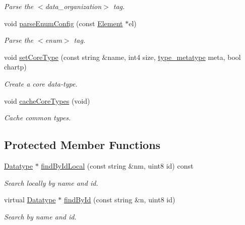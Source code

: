 \begin{DoxyCompactItemize}
\begin{DoxyCompactList}\small\item\em Parse the $<$data\+\_\+organization$>$ tag. \end{DoxyCompactList}\item 
void \mbox{\hyperlink{class_type_factory_a8d10b37cae4c213ca3a613f454ada676}{parse\+Enum\+Config}} (const \mbox{\hyperlink{class_element}{Element}} $\ast$el)
\begin{DoxyCompactList}\small\item\em Parse the $<$enum$>$ tag. \end{DoxyCompactList}\item 
void \mbox{\hyperlink{class_type_factory_a7f142a54450d41bc12ca18fe06c6e1e0}{set\+Core\+Type}} (const string \&name, int4 size, \mbox{\hyperlink{type_8hh_aef6429f2523cdf4d415ba04a0209e61f}{type\+\_\+metatype}} meta, bool chartp)
\begin{DoxyCompactList}\small\item\em Create a core data-\/type. \end{DoxyCompactList}\item 
void \mbox{\hyperlink{class_type_factory_a16ccfeecd29c1d5d40ada6b1d4032212}{cache\+Core\+Types}} (void)
\begin{DoxyCompactList}\small\item\em Cache common types. \end{DoxyCompactList}\end{DoxyCompactItemize}
\subsection*{Protected Member Functions}
\begin{DoxyCompactItemize}
\item 
\mbox{\hyperlink{class_datatype}{Datatype}} $\ast$ \mbox{\hyperlink{class_type_factory_ab86f43d69c0f879d315ce2aacc1f7326}{find\+By\+Id\+Local}} (const string \&nm, uint8 id) const
\begin{DoxyCompactList}\small\item\em Search locally by name and id. \end{DoxyCompactList}\item 
virtual \mbox{\hyperlink{class_datatype}{Datatype}} $\ast$ \mbox{\hyperlink{class_type_factory_a79cd8d76884043080a3430f3aff8b010}{find\+By\+Id}} (const string \&n, uint8 id)
\begin{DoxyCompactList}\small\item\em Search by name and id. \end{DoxyCompactList}\end{DoxyCompactItemize}
